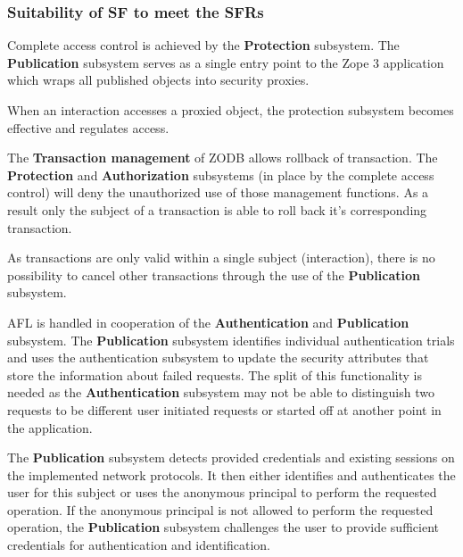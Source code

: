 \documentclass[12pt,english]{scrbook}
\begin{document}
\subsubsection{Suitability of SF to meet the SFRs}


Complete access control is achieved by the \textbf{Protection} subsystem. The
\textbf{Publication} subsystem serves as a single entry point to the Zope 3
application which wraps all published objects into security proxies.

When an interaction accesses a proxied object, the protection subsystem
becomes effective and regulates access.



The \textbf{Transaction management} of ZODB allows rollback of transaction. The
\textbf{Protection} and \textbf{Authorization} subsystems (in place by the
complete access control) will deny the unauthorized use of those management
functions. As a result only the subject of a transaction is able to roll back
it's corresponding transaction.

As transactions are only valid within a single subject (interaction), there is no
possibility to cancel other transactions through the use of the
\textbf{Publication} subsystem.


AFL is handled in cooperation of the \textbf{Authentication} and
\textbf{Publication} subsystem. The \textbf{Publication} subsystem identifies
individual authentication trials and uses the authentication subsystem to
update the security attributes that store the information about failed
requests. The split of this functionality is needed as the
\textbf{Authentication} subsystem may not be able to distinguish two requests
to be different user initiated requests or started off at another point in the
application.
  


The \textbf{Publication} subsystem detects provided credentials and existing
sessions on the implemented network protocols. It then either identifies and
authenticates the user for this subject or uses the anonymous principal to
perform the requested operation. If the anonymous principal is not allowed to
perform the requested operation, the \textbf{Publication} subsystem challenges
the user to provide sufficient credentials for authentication and
identification.
\end{document}
